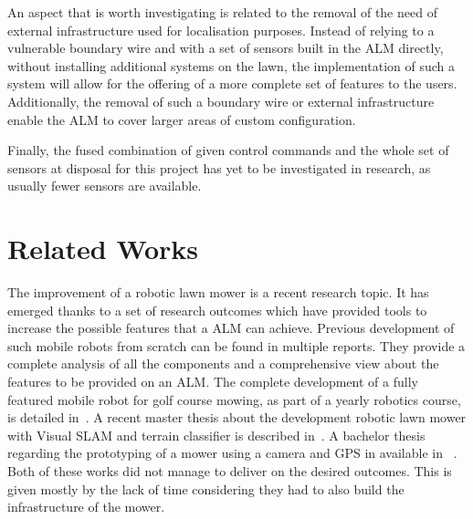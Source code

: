 An aspect that is worth investigating is related to the removal of the need of external infrastructure used for localisation purposes.
Instead of relying to a vulnerable boundary wire and with a set of sensors built in the \gls{ALM} directly, without installing additional systems on the lawn, the implementation of such a system will allow for the offering of a more complete set of features to the users.
Additionally, the removal of such a boundary wire or external infrastructure enable the \gls{ALM} to cover larger areas of custom configuration.

Finally, the fused combination of given control commands and the whole set of sensors at disposal for this project has yet to be investigated in research, as usually fewer sensors are available.





\section{Related Works}

\noindent
The improvement of a robotic lawn mower is a recent research topic. It has emerged thanks to a set of research outcomes which have provided tools to increase the possible features that a \gls{ALM} can achieve.
Previous development of such mobile robots from scratch can be found in multiple reports.
They provide a complete analysis of all the components and a comprehensive view about the features to be provided on an \gls{ALM}.
The complete development of a fully featured mobile robot for golf course mowing, as part of a yearly robotics course, is detailed in~\cite{noauthor_groundsbot_nodate}.
A recent master thesis about the development robotic lawn mower with Visual SLAM and terrain classifier is described in~\cite{lukas_robotic_2020}.
A bachelor thesis regarding the prototyping of a mower using a camera and GPS in available in~ \cite{andersson_smart_2018}.
Both of these works did not manage to deliver on the desired outcomes. This is given mostly by the lack of time considering they had to also build the infrastructure of the mower.


